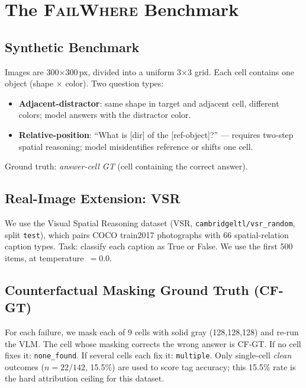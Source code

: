 \documentclass[twoside,11pt]{article}
\begin{document}
\section{The \textsc{FailWhere} Benchmark}

\subsection{Synthetic Benchmark}

Images are 300$\times$300\,px, divided into a uniform 3$\times$3 grid.
Each cell contains one object (shape $\times$ color).
Two question types:

\begin{itemize}
  \item \textbf{Adjacent-distractor}: same shape in target and adjacent cell,
    different colors; model answers with the distractor color.
  \item \textbf{Relative-position}: ``What is [dir] of the [ref-object]?'' —
    requires two-step spatial reasoning; model misidentifies reference or shifts
    one cell.
\end{itemize}

\noindent Ground truth: \emph{answer-cell GT} (cell containing the correct answer).

\subsection{Real-Image Extension: VSR}

We use the Visual Spatial Reasoning dataset \citep{liu-2023-vsr}
(VSR, \texttt{cambridgeltl/vsr\_random}, split \texttt{test}),
which pairs COCO train2017 photographs with 66 spatial-relation caption types.
Task: classify each caption as True or False.
We use the first 500 items, at temperature~$= 0.0$.

\subsection{Counterfactual Masking Ground Truth (CF-GT)}

For each failure, we mask each of 9 cells with solid gray (128,128,128)
and re-run the VLM.
The cell whose masking corrects the wrong answer is CF-GT.
If no cell fixes it: \texttt{none\_found}.
If several cells each fix it: \texttt{multiple}.
Only single-cell \emph{clean} outcomes ($n{=}22/142$, 15.5\%) are used to score
tag accuracy; this 15.5\% rate is the hard attribution ceiling for this dataset.
\end{document}
